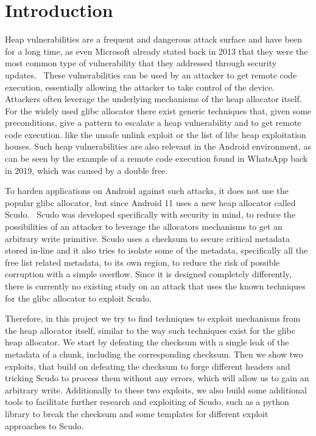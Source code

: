 \documentclass[a4paper,11pt,oneside]{report}
\begin{document}
\maketoc{}

\chapter{Introduction}

Heap vulnerabilities are a frequent and dangerous attack surface and have been for a long
time, as even Microsoft already stated back in 2013 that they were the most common type of
vulnerability that they addressed through security updates.~\cite{microsoftHeapReport}
These vulnerabilities can be used by an attacker to get remote code execution, essentially allowing
the attacker to take control of the device.
Attackers often leverage the underlying mechanisms of the heap allocator itself.
For the widely used glibc allocator there exist
generic techniques that, given some preconditions, give a pattern to escalate a heap
vulnerability and to get remote code execution. 
like the unsafe unlink exploit or
the list of libc heap exploitation houses. Such heap vulnerabilities are also relevant in
the Android environment, as can be seen by the example of a remote code execution found in
WhatsApp back in 2019, which was caused by a double free.~\cite{whatsappRCE}

To harden applications on Android against such attacks, it does not use the popular glibc
allocator, but since Android 11 uses a new heap allocator called Scudo.~\cite{llvmScudo}
Scudo was developed specifically with security in mind, to reduce the possibilities of an
attacker to leverage the allocators mechanisms to get an arbitrary write primitive. Scudo
uses a checksum to secure critical metadata stored in-line and it also tries to isolate
some of the metadata, specifically all the free list related metadata, to its own region,
to reduce the risk of possible corruption with a simple overflow. Since it is designed
completely differently, there is currently no existing study on an attack that uses the
known techniques for the glibc allocator to exploit Scudo.

Therefore, in this project we try to find techniques to exploit mechanisms from the heap
allocator itself, similar to the way such techniques exist for the glibc heap
allocator. We start by defeating the checksum with a single leak of the metadata of a
chunk, including the corresponding checksum. Then we show two exploits, that build on
defeating the checksum to forge different headers and tricking Scudo to process them
without any errors, which will allow us to gain an arbitrary write. Additionally to these
two exploits, we also build some additional tools to facilitate further research and
exploiting of Scudo, such as a python library to break the checksum and some templates for
different exploit approaches to Scudo.
\end{document}
